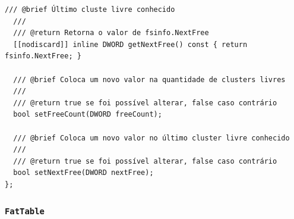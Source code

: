 \documentclass[
    12pt,				%
    oneside,   	        %
    a4paper,			%
    english,			%
    french,				%
    spanish,			%
    brazil,				%
    ]{pacotes/abntex2}
\begin{document}
\begin{lstlisting}[caption={Classe que abstrai a extração de informações da estrutura FSInfo}, label={lst:fileinfo}]
  /// @brief Último cluste livre conhecido
  ///
  /// @return Retorna o valor de fsinfo.NextFree
  [[nodiscard]] inline DWORD getNextFree() const { return fsinfo.NextFree; }

  /// @brief Coloca um novo valor na quantidade de clusters livres
  ///
  /// @return true se foi possível alterar, false caso contrário
  bool setFreeCount(DWORD freeCount);

  /// @brief Coloca um novo valor no último cluster livre conhecido
  ///
  /// @return true se foi possível alterar, false caso contrário
  bool setNextFree(DWORD nextFree);
};
\end{lstlisting}

\subsubsection{\texttt{FatTable}}
\label{subsubsec:fat_table}
\end{document}
